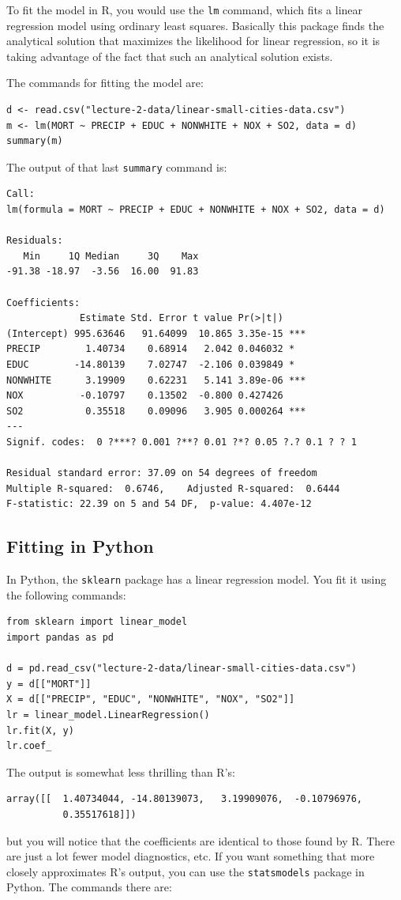 To fit the model in R, you would use the \texttt{lm} command, which fits a linear regression model using ordinary least squares. Basically this package finds the analytical solution that maximizes the likelihood for linear regression, so it is taking advantage of the fact that such an analytical solution exists.

\noindent The commands for fitting the model are:
{\small
\begin{verbatim}
d <- read.csv("lecture-2-data/linear-small-cities-data.csv")
m <- lm(MORT ~ PRECIP + EDUC + NONWHITE + NOX + SO2, data = d)
summary(m)
\end{verbatim}
}

\noindent The output of that last \texttt{summary} command is:

{\small
\begin{verbatim}
Call:
lm(formula = MORT ~ PRECIP + EDUC + NONWHITE + NOX + SO2, data = d)

Residuals:
   Min     1Q Median     3Q    Max 
-91.38 -18.97  -3.56  16.00  91.83 

Coefficients:
             Estimate Std. Error t value Pr(>|t|)    
(Intercept) 995.63646   91.64099  10.865 3.35e-15 ***
PRECIP        1.40734    0.68914   2.042 0.046032 *  
EDUC        -14.80139    7.02747  -2.106 0.039849 *  
NONWHITE      3.19909    0.62231   5.141 3.89e-06 ***
NOX          -0.10797    0.13502  -0.800 0.427426    
SO2           0.35518    0.09096   3.905 0.000264 ***
---
Signif. codes:  0 ?***? 0.001 ?**? 0.01 ?*? 0.05 ?.? 0.1 ? ? 1

Residual standard error: 37.09 on 54 degrees of freedom
Multiple R-squared:  0.6746,	Adjusted R-squared:  0.6444 
F-statistic: 22.39 on 5 and 54 DF,  p-value: 4.407e-12
\end{verbatim}
}

\subsection*{Fitting in Python}

In Python, the \texttt{sklearn} package has a linear regression model. You fit it using the following commands:

{\small
\begin{verbatim}
from sklearn import linear_model
import pandas as pd

d = pd.read_csv("lecture-2-data/linear-small-cities-data.csv")
y = d[["MORT"]]
X = d[["PRECIP", "EDUC", "NONWHITE", "NOX", "SO2"]]
lr = linear_model.LinearRegression()
lr.fit(X, y)
lr.coef_
\end{verbatim}
}
\noindent The output is somewhat less thrilling than R's:
{\small
\begin{verbatim}
array([[  1.40734044, -14.80139073,   3.19909076,  -0.10796976,
          0.35517618]])
\end{verbatim}
}
\noindent but you will notice that the coefficients are identical to those found by R. There are just a lot fewer model diagnostics, etc. If you want something that more closely approximates R's output, you can use the \texttt{statsmodels} package in Python. The commands there are:


